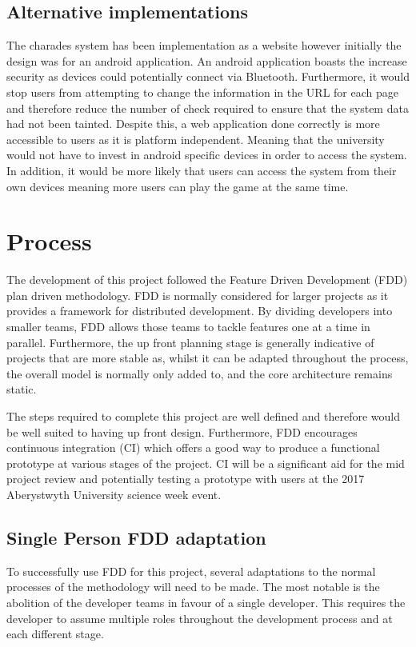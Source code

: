 \subsection{Alternative implementations}
The charades system has been implementation as a website however initially the design was for an android application. An android application boasts the increase security as devices could potentially connect via Bluetooth. Furthermore, it would stop users from attempting to change the information in the URL for each page and therefore reduce the number of check required to ensure that the system data had not been tainted.
Despite this, a web application done correctly is more accessible to users as it is platform independent. Meaning that the university would not have to invest in android specific devices in order to access the system. In addition, it would be more likely that users can access the system from their own devices meaning more users can play the game at the same time.

\section{Process}
The development of this project followed the Feature Driven Development (FDD) plan driven methodology. FDD is normally considered for larger projects as it provides a framework for distributed development. By dividing developers into smaller teams, FDD allows those teams to tackle features one at a time in parallel. Furthermore, the up front planning stage is generally indicative of projects that are more stable as, whilst it can be adapted throughout the process, the overall model is normally only added to, and the core architecture remains static.

The steps required to complete this project are well defined and therefore would be well suited to having up front design. Furthermore, FDD encourages continuous integration (CI) which offers  a good way to produce a functional prototype at various stages of the project. CI will be a significant aid for the mid project review and potentially testing a prototype with users at the 2017 Aberystwyth University science week event.

\subsection{Single Person FDD adaptation}
To successfully use FDD for this project, several adaptations to the normal processes of the methodology will need to be made. The most notable is the abolition of the developer teams in favour of a single developer. This requires the developer to assume multiple roles throughout the development process and at each different stage.

